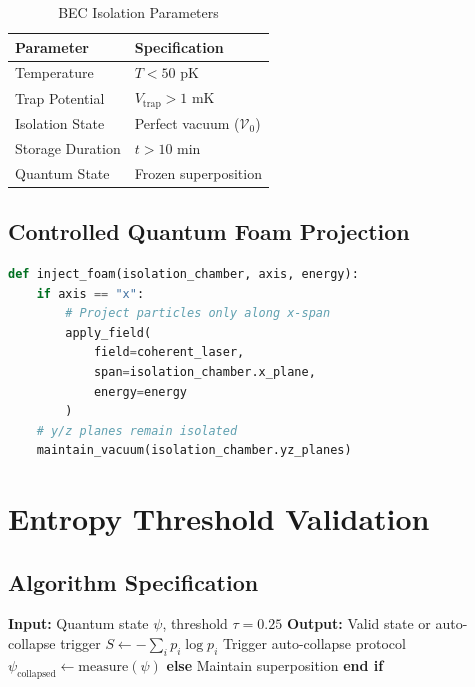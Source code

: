 \documentclass[12pt]{article}
\begin{document}
\begin{table}[H]
\centering
\caption{BEC Isolation Parameters}
\begin{tabular}{|l|l|}
\hline
\textbf{Parameter} & \textbf{Specification} \\
\hline
Temperature & $T < 50$ pK \\
\hline
Trap Potential & $V_{\text{trap}} > 1$ mK \\
\hline
Isolation State & Perfect vacuum ($\mathcal{V}_0$) \\
\hline
Storage Duration & $t > 10$ min \\
\hline
Quantum State & Frozen superposition \\
\hline
\end{tabular}
\end{table}

\subsection{Controlled Quantum Foam Projection}
\begin{lstlisting}[language=Python, caption=Quantum Foam Injection Protocol]
def inject_foam(isolation_chamber, axis, energy):
    if axis == "x":
        # Project particles only along x-span
        apply_field(
            field=coherent_laser,
            span=isolation_chamber.x_plane,
            energy=energy
        )
    # y/z planes remain isolated
    maintain_vacuum(isolation_chamber.yz_planes)
\end{lstlisting}

\section{Entropy Threshold Validation}

\subsection{Algorithm Specification}
\begin{algorithm}
\caption{Entropy Threshold Validation}
\begin{algorithmic}
\State \textbf{Input:} Quantum state $\psi$, threshold $\tau = 0.25$
\State \textbf{Output:} Valid state or auto-collapse trigger
\State
\State $S \gets -\sum_i p_i \log p_i$ 
\State \quad Trigger auto-collapse protocol
\State \quad $\psi_{\text{collapsed}} \gets \text{measure}(\psi)$
\State \textbf{else}
\State \quad Maintain superposition
\State \textbf{end if}
\end{algorithmic}
\end{algorithm}
\end{document}
